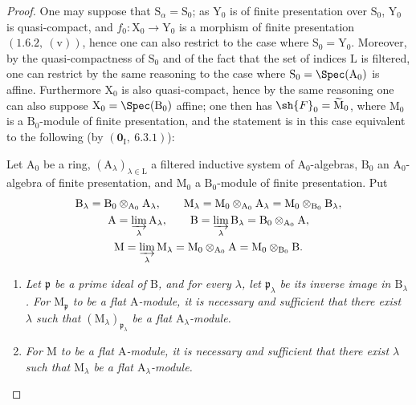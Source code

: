 \begin{proof}
One may suppose that $\mathrm{S}_\alpha=\mathrm{S}_0$; as $\mathrm{Y}_0$ is of finite presentation over $\mathrm{S}_0$, $\mathrm{Y}_0$ is quasi-compact, and $f_0:\mathrm{X}_0\to\mathrm{Y}_0$ is a morphism of finite presentation $(1.6.2,~(\mathrm{v}))$, hence one can also restrict to the case where $\mathrm{S}_0=\mathrm{Y}_0$. Moreover, by the quasi-compactness of $\mathrm{S}_0$ and of the fact that the set of indices $\mathrm{L}$ is filtered, one can restrict by the same reasoning to the case where $\mathrm{S}_0=\Spec(\mathrm{A}_0)$ is affine. Furthermore $\mathrm{X}_0$ is also quasi-compact, hence by the same reasoning one can also suppose $\mathrm{X}_0=\Spec(\mathrm{B}_0)$ affine; one then has $\sh{F}_0=\widetilde{\mathrm{M}}_0$, where $\mathrm{M}_0$ is a $\mathrm{B}_0$-module of finite presentation, and the statement  is in this case equivalent to the following (by $(\mathbf{0}_\mathrm{I},~6.3.1)$):

\begin{corollary}[11.2.6.1]
\label{IV.11.2.6.1}
Let $\mathrm{A}_0$ be a ring,
$(\mathrm{A}_\lambda)_{\lambda\in\mathrm{L}}$ a filtered inductive
system of $\mathrm{A}_0$-algebras, $\mathrm{B}_0$ an
$\mathrm{A}_0$-algebra of finite presentation, and $\mathrm{M}_0$ a
$\mathrm{B}_0$-module of finite presentation. Put
\[
\begin{gathered}
  \mathrm{B}_\lambda
    =\mathrm{B}_0\otimes_{\mathrm{A}_0}\mathrm{A}_\lambda,\qquad
  \mathrm{M}_\lambda
    =\mathrm{M}_0\otimes_{\mathrm{A}_0}\mathrm{A}_\lambda
    =\mathrm{M}_0\otimes_{\mathrm{B}_0}\mathrm{B}_\lambda,\\
  \mathrm{A}=\varinjlim_\lambda\mathrm{A}_\lambda,\qquad
  \mathrm{B}=\varinjlim_\lambda\mathrm{B}_\lambda
    =\mathrm{B}_0\otimes_{\mathrm{A}_0}\mathrm{A},\\
  \mathrm{M}=\varinjlim_\lambda\mathrm{M}_\lambda
    =\mathrm{M}_0\otimes_{\mathrm{A}_0}\mathrm{A}
    =\mathrm{M}_0\otimes_{\mathrm{B}_0}\mathrm{B}.
\end{gathered}
\]
\begin{enumerate}[label=\emph{(\roman*)}]
  \item \emph{Let $\mathfrak{p}$ be a prime ideal of $\mathrm{B}$, and for every $\lambda$, let $\mathfrak{p}_\lambda$ be its inverse image in $\mathrm{B}_\lambda$. For $\mathrm{M}_\mathfrak{p}$ to be a flat $\mathrm{A}$-module, it is necessary and sufficient that there exist $\lambda$ such that $(\mathrm{M}_\lambda)_{\mathfrak{p}_\lambda}$ be a flat $\mathrm{A}_\lambda$-module.}
  \item \emph{For $\mathrm{M}$ to be a flat $\mathrm{A}$-module, it is necessary and sufficient that there exist $\lambda$ such that $\mathrm{M}_\lambda$ be a flat $\mathrm{A}_\lambda$-module.}
\end{enumerate}
\end{corollary}


\end{proof}
